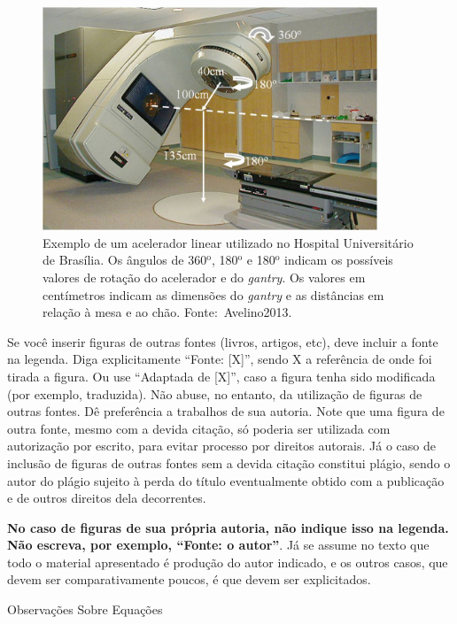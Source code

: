 \documentclass[a4paper, 12pt]{ppgeb}
\makeatletter
\renewcommand{\section}{\@startsection
{section}
{1}
{0mm}
{-\baselineskip}
{0.5\baselineskip}
{\large\bfseries\scshape}}
\makeatother
\begin{document}
\begin{figure}[h]
\centering
\includegraphics[width=100mm]{Acelerador2}
\caption[Exemplo de um acelerador linear utilizado no Hospital Universitário de Brasília.]{Exemplo de um acelerador linear utilizado no Hospital Universitário de Brasília. Os ângulos de 360${^{\textrm{o}} }$, 180${^{\textrm{o}} }$ e 180${^{\textrm{o}} }$ indicam os possíveis valores de rotação do acelerador e do \emph{gantry}. Os valores em centímetros indicam as dimensões do \emph{gantry} e as distâncias em relação à mesa e ao chão. Fonte:~\cite{mainreferences}{Avelino2013}.}\label{fig:acelerador}
\end{figure}

Se você inserir figuras de outras fontes (livros, artigos, etc), deve incluir a fonte na legenda. Diga explicitamente ``Fonte: [X]'', sendo X a referência de onde foi tirada a figura. Ou use ``Adaptada de [X]'', caso a figura tenha sido modificada (por exemplo, traduzida). Não abuse, no entanto, da utilização de figuras de outras fontes. Dê preferência a trabalhos de sua autoria. Note que uma figura de outra fonte, mesmo com a devida citação, só poderia ser utilizada com autorização por escrito, para evitar processo por direitos autorais. Já o caso de inclusão de figuras de outras fontes sem a devida citação constitui plágio, sendo o autor do plágio sujeito à perda do título eventualmente obtido com a publicação e de outros direitos dela decorrentes.

\textbf{No caso de figuras de sua própria autoria, não indique isso na legenda. Não escreva, por exemplo, ``Fonte: o autor''}. Já se assume no texto que todo o material apresentado é produção do autor indicado, e os outros casos, que devem ser comparativamente poucos, é que devem ser explicitados.

\section{Observações Sobre Equações}
\end{document}

